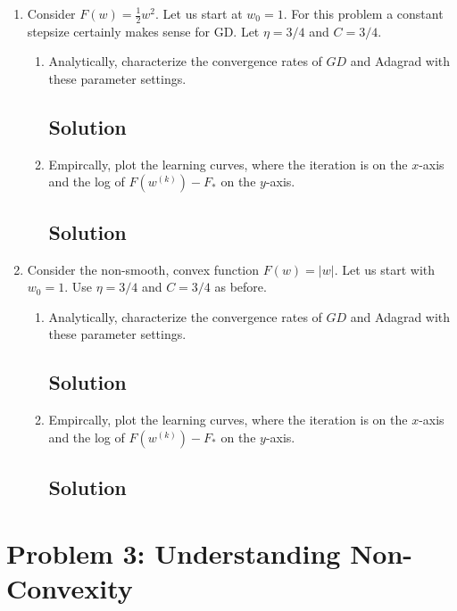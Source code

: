 \documentclass[letterpaper,11pt]{article}
\begin{document}
\begin{enumerate}
\item Consider $F(w) = \frac{1}{2}w^2$. Let us start at $w_0 = 1$. For this
  problem a constant stepsize certainly makes sense for GD. Let $\eta = 3/4$ and
  $C = 3/4$.

  \begin{enumerate}
  \item Analytically, characterize the convergence rates of $GD$ and Adagrad
    with these parameter settings.

    \subsection*{Solution}
  \item Empircally, plot the learning curves, where the iteration is on the
    $x$-axis and the log of $F\left(w^{(k)}\right) - F_*$ on the $y$-axis.

    \subsection*{Solution}
  \end{enumerate}
  
\item Consider the non-smooth, convex function $F(w) = \lvert w \rvert$. Let us
  start with $w_0 = 1$. Use $\eta = 3/4$ and $C = 3/4$ as before.

  \begin{enumerate}
  \item Analytically, characterize the convergence rates of $GD$ and Adagrad
    with these parameter settings.

    \subsection*{Solution}
  \item Empircally, plot the learning curves, where the iteration is on the
    $x$-axis and the log of $F\left(w^{(k)}\right) - F_*$ on the $y$-axis.

    \subsection*{Solution}
  \end{enumerate}
\end{enumerate}

\section*{Problem 3: Understanding Non-Convexity}
\end{document}

